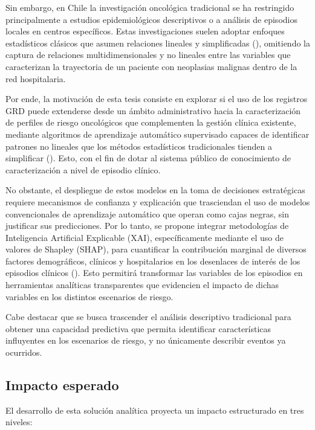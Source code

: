Sin embargo, en Chile la investigación oncológica tradicional se ha restringido principalmente a estudios epidemiológicos descriptivos o a análisis de episodios locales en centros específicos. Estas investigaciones suelen adoptar enfoques estadísticos clásicos que asumen relaciones lineales y simplificadas (\cite{scielo1, scielo2}), omitiendo la captura de relaciones multidimensionales y no lineales entre las variables que caracterizan la trayectoria de un paciente con neoplasias malignas dentro de la red hospitalaria.

Por ende, la motivación de esta tesis consiste en explorar si el uso de los registros GRD puede extenderse desde un ámbito administrativo hacia la caracterización de perfiles de riesgo oncológicos que complementen la gestión clínica existente, mediante algoritmos de aprendizaje automático supervisado capaces de identificar patrones no lineales que los métodos estadísticos tradicionales tienden a simplificar (\cite{hastie2009elements, article11}). Esto, con el fin de dotar al sistema público de conocimiento de caracterización a nivel de episodio clínico.

No obstante, el despliegue de estos modelos en la toma de decisiones estratégicas requiere mecanismos de confianza y explicación que trasciendan el uso de modelos convencionales de aprendizaje automático que operan como cajas negras, sin justificar sus predicciones. Por lo tanto, se propone integrar metodologías de Inteligencia Artificial Explicable (XAI), específicamente mediante el uso de valores de Shapley (SHAP), para cuantificar la contribución marginal de diversos factores demográficos, clínicos y hospitalarios en los desenlaces de interés de los episodios clínicos (\cite{lundberg2017shap}). Esto permitirá transformar las variables de los episodios en herramientas analíticas transparentes que evidencien el impacto de dichas variables en los distintos escenarios de riesgo.

Cabe destacar que se busca trascender el análisis descriptivo tradicional para obtener una capacidad predictiva que permita identificar características influyentes en los escenarios de riesgo, y no únicamente describir eventos ya ocurridos.

\subsection{Impacto esperado}
\label{intro:impacto}

El desarrollo de esta solución analítica proyecta un impacto estructurado en tres niveles:

